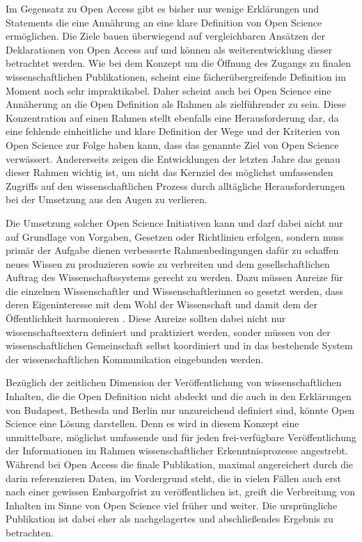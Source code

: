 Im Gegensatz zu Open Access gibt es bisher nur wenige Erklärungen und Statements die eine Annährung an eine klare Definition von Open Science ermöglichen. Die Ziele bauen überwiegend auf vergleichbaren Ansätzen der Deklarationen von Open Access auf und können als weiterentwicklung dieser betrachtet werden. Wie bei dem Konzept um die Öffnung des Zugangs zu finalen wissenschaftlichen Publikationen, scheint eine fächerübergreifende Definition im Moment noch sehr impraktikabel. Daher scheint auch bei Open Science eine Annäherung an die Open Definition als Rahmen als zielführender zu sein. Diese Konzentration auf einen Rahmen stellt ebenfalls eine Herausforderung dar, da eine fehlende einheitliche und klare Definition der Wege und der Kriterien von Open Science zur Folge haben kann, dass das genannte Ziel von Open Science verwässert. Andererseits zeigen die Entwicklungen der letzten Jahre das genau dieser Rahmen wichtig ist, um nicht das Kernziel des möglichst umfassenden Zugriffs auf den wissenschaftlichen Prozess durch alltägliche Herausforderungen bei der Umsetzung aus den Augen zu verlieren.

Die Umsetzung solcher Open Science Initiativen kann und darf dabei nicht nur auf Grundlage von Vorgaben, Gesetzen oder Richtlinien erfolgen, sondern muss primär der Aufgabe dienen verbesserte Rahmenbedingungen dafür zu schaffen neues Wissen zu produzieren sowie zu verbreiten und dem gesellschaftlichen Auftrag des Wissenschaftssystems gerecht zu werden. Dazu müssen Anreize für die einzelnen Wissenschaftler und Wissenschaftlerinnen so gesetzt werden, dass deren Eigeninteresse mit dem Wohl der Wissenschaft und damit dem der Öffentlichkeit harmonieren \cite{brembs2015open}. Diese Anreize sollten dabei nicht nur wissenschaftsextern definiert und praktiziert werden, sonder müssen von der wissenschaftlichen Gemeinschaft selbst koordiniert und in das bestehende System der wissenschaftlichen Kommunikation eingebunden werden.

Bezüglich der zeitlichen Dimension der Veröffentlichung von wissenschaftlichen Inhalten, die die Open Definition nicht abdeckt und die auch in den Erklärungen von Budapest, Bethesda und Berlin nur unzureichend definiert sind, könnte Open Science eine Lösung darstellen. Denn es wird in diesem Konzept eine unmittelbare, möglichst umfassende und für jeden frei-verfügbare Veröffentlichung der Informationen im Rahmen wissenschaftlicher Erkenntnisprozesse angestrebt. Während bei Open Access die finale Publikation, maximal angereichert durch die darin referenzieren Daten, im Vordergrund steht, die in vielen Fällen auch erst nach einer gewissen Embargofrist zu veröffentlichen ist, greift die Verbreitung von Inhalten im Sinne von Open Science viel früher und weiter. Die ursprüngliche Publikation ist dabei eher als nachgelagertes und abschließendes Ergebnis zu betrachten.

